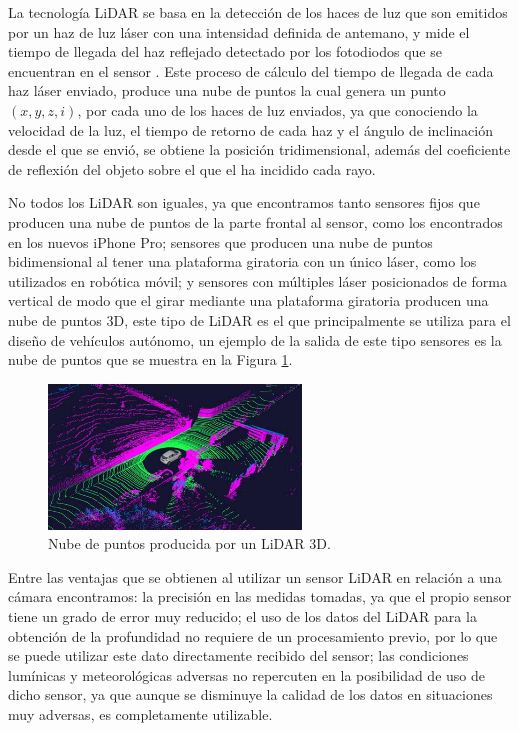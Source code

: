 La tecnología \ac{LiDAR} se basa en la detección de los haces de luz que son emitidos por un haz de luz láser con una intensidad definida de antemano, y mide el tiempo de llegada del haz reflejado detectado por los fotodiodos que se encuentran en el sensor \cite{paper_comparison_lidar_camera, what_lidar}. Este proceso de cálculo del tiempo de llegada de cada haz láser enviado, produce una nube de puntos la cual genera un punto $(x, y, z, i)$, por cada uno de los haces de luz enviados, ya que conociendo la velocidad de la luz, el tiempo de retorno de cada haz y el ángulo de inclinación desde el que se envió, se obtiene la posición tridimensional, además del coeficiente de reflexión del objeto sobre el que el ha incidido cada rayo.

No todos los \ac{LiDAR} son iguales, ya que encontramos tanto sensores fijos que producen una nube de puntos de la parte frontal al sensor, como los encontrados en los nuevos iPhone Pro; sensores que producen una nube de puntos bidimensional al tener una plataforma giratoria con un único láser, como los utilizados en robótica móvil; y sensores con múltiples láser posicionados de forma vertical de modo que el girar mediante una plataforma giratoria producen una nube de puntos 3D, este tipo de \ac{LiDAR} es el que principalmente se utiliza para el diseño de vehículos autónomo, un ejemplo de la salida de este tipo sensores es la nube de puntos que se muestra en la Figura \ref{fig:Nube de puntos producida por un LiDAR 3D.}.

\begin{figure}[H]
    \centering
    \includegraphics[width=0.6\textwidth]{Book/figures/1_introduccion/pointcloud.png}
    \caption{Nube de puntos producida por un LiDAR 3D.}
    \label{fig:Nube de puntos producida por un LiDAR 3D.}
\end{figure}

Entre las ventajas que se obtienen al utilizar un sensor \ac{LiDAR} en relación a una cámara encontramos: la precisión en las medidas tomadas, ya que el propio sensor tiene un grado de error muy reducido; el uso de los datos del \acs{LiDAR} para la obtención de la profundidad no requiere de un procesamiento previo, por lo que se puede utilizar este dato directamente recibido del sensor; las condiciones lumínicas y meteorológicas adversas no repercuten en la posibilidad de uso de dicho sensor, ya que aunque se disminuye la calidad de los datos en situaciones muy adversas, es completamente utilizable.

